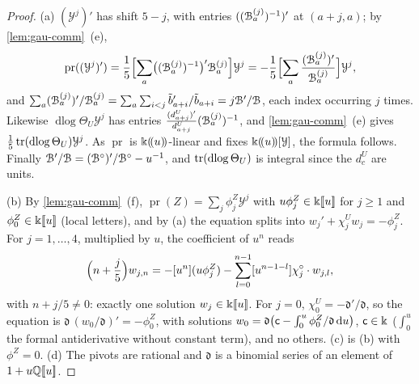 \begin{proof}
(a) $(\mathcal Y^j)'$ has shift $5-j$, with entries $((\mathcal{B}^{(j)}_a)^{-1})'$ at $(a+j,a)$; by \cref{lem:gau-comm}~(e),
\[
\operatorname{pr}((\mathcal Y^j)')=\frac15\Bigl[\sum_a\bigl((\mathcal{B}^{(j)}_a)^{-1}\bigr)'\mathcal{B}^{(j)}_a\Bigr]\mathcal Y^j=-\frac15\Bigl[\sum_a\frac{(\mathcal{B}^{(j)}_a)'}{\mathcal{B}^{(j)}_a}\Bigr]\mathcal Y^j ,
\]
and $\sum_a(\mathcal{B}^{(j)}_a)'/\mathcal{B}^{(j)}_a=\sum_a\sum_{i<j}\tilde b_{a+i}'/\tilde b_{a+i}=j\mathcal{B}'/\mathcal{B}$, each index occurring $j$ times. Likewise $\operatorname{dlog}\Theta_U\mathcal Y^j$ has entries $\frac{(d^U_{a+j})'}{d^U_{a+j}}(\mathcal{B}^{(j)}_a)^{-1}$, and \cref{lem:gau-comm}~(e) gives $\frac15\operatorname{tr}(\operatorname{dlog}\Theta_U)\mathcal Y^j$. As $\operatorname{pr}$ is $\Bbbk(\!(u)\!)$-linear and fixes $\Bbbk(\!(u)\!)[\mathcal Y]$, the formula follows. Finally $\mathcal{B}'/\mathcal{B}=(\mathcal{B}^\circ)'/\mathcal{B}^\circ-u^{-1}$, and $\operatorname{tr}(\operatorname{dlog}\Theta_U)$ is integral since the $d^U_c$ are units.

(b) By \cref{lem:gau-comm}~(f), $\operatorname{pr}(Z)=\sum_j\phi^Z_j\mathcal Y^j$ with $u\phi^Z_j\in\Bbbk[\![ u ]\!]$ for $j\geq1$ and $\phi^Z_0\in\Bbbk[\![ u ]\!]$ (local letters), and by (a) the equation splits into $w_j'+\chi^U_jw_j=-\phi^Z_j$. For $j=1,\dots,4$, multiplied by $u$, the coefficient of $u^n$ reads
\[
\Bigl(n+\frac j5\Bigr)w_{j,n}=-[u^n](u\phi^Z_j)-\sum_{l=0}^{n-1}[u^{n-1-l}]\chi^\circ_j\cdot w_{j,l},
\]
with $n+j/5\neq0$: exactly one solution $w_j\in\Bbbk[\![ u ]\!]$. For $j=0$, $\chi^U_0=-\mathfrak d'/\mathfrak d$, so the equation is $\mathfrak d\,(w_0/\mathfrak d)'=-\phi^Z_0$, with solutions $w_0=\mathfrak d\bigl(\mathsf{c}-\int_0^u\phi^Z_0/\mathfrak d\,\mathrm{d} u\bigr)$, $\mathsf{c}\in\Bbbk$ ($\int_0^u$ the formal antiderivative without constant term), and no others. (c) is (b) with $\phi^Z=0$. (d) The pivots are rational and $\mathfrak d$ is a binomial series of an element of $1+u\mathbb{Q}[\![ u ]\!]$.
\end{proof}


